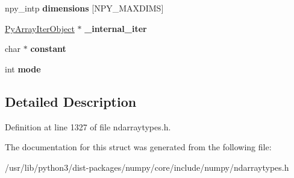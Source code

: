 \begin{DoxyCompactItemize}
\item 
npy\+\_\+intp {\bfseries dimensions} \mbox{[}N\+P\+Y\+\_\+\+M\+A\+X\+D\+I\+MS\mbox{]}\hypertarget{structPyArrayNeighborhoodIterObject_aa34291af257e9846d003e83ca8bc7c86}{}\label{structPyArrayNeighborhoodIterObject_aa34291af257e9846d003e83ca8bc7c86}

\item 
\hyperlink{structPyArrayIterObject__tag}{Py\+Array\+Iter\+Object} $\ast$ {\bfseries \+\_\+internal\+\_\+iter}\hypertarget{structPyArrayNeighborhoodIterObject_ac12945e7793a4ee787eba11a8fbcde9c}{}\label{structPyArrayNeighborhoodIterObject_ac12945e7793a4ee787eba11a8fbcde9c}

\item 
char $\ast$ {\bfseries constant}\hypertarget{structPyArrayNeighborhoodIterObject_ab21ba3260b2f59bec50ea758ac350962}{}\label{structPyArrayNeighborhoodIterObject_ab21ba3260b2f59bec50ea758ac350962}

\item 
int {\bfseries mode}\hypertarget{structPyArrayNeighborhoodIterObject_a838063984ec1a280065b2d78259f4105}{}\label{structPyArrayNeighborhoodIterObject_a838063984ec1a280065b2d78259f4105}

\end{DoxyCompactItemize}


\subsection{Detailed Description}


Definition at line 1327 of file ndarraytypes.\+h.



The documentation for this struct was generated from the following file\+:\begin{DoxyCompactItemize}
\item 
/usr/lib/python3/dist-\/packages/numpy/core/include/numpy/ndarraytypes.\+h\end{DoxyCompactItemize}
